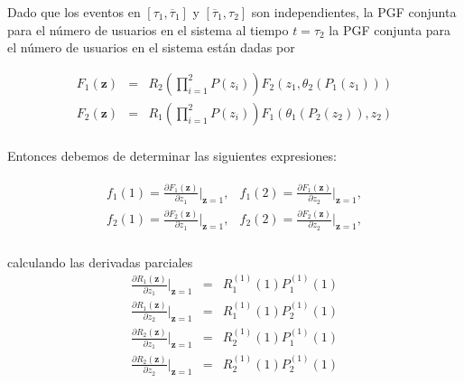 \documentclass{article}
\begin{document}
Dado que los eventos en
$\left[\tau_{1},\overline{\tau}_{1}\right]$ y $\left[\overline{\tau}_{1},\tau_{2}\right]$ son independientes, la
PGF conjunta para el n\'umero de usuarios en el sistema al tiempo $t=\tau_{2}$ la PGF conjunta para el n\'umero de usuarios en el sistema est\'an dadas por

\begin{eqnarray*}
F_{1}\left(\mathbf{z}\right)&=&R_{2}\left(\prod_{i=1}^{2}P\left(z_{i}\right)\right)F_{2}\left(z_{1},\theta_{2}\left(P_{1}\left(z_{1}\right)\right)\right)\\
F_{2}\left(\mathbf{z}\right)&=&R_{1}\left(\prod_{i=1}^{2}P\left(z_{i}\right)\right)F_{1}\left(\theta_{1}\left(P_{2}\left(z_{2}\right)\right),z_{2}\right)\\
\end{eqnarray*}

Entonces debemos de determinar las siguientes expresiones:

\begin{eqnarray*}
\begin{array}{cc}
f_{1}\left(1\right)=\frac{\partial F_{1}\left(\mathbf{z}\right)}{\partial z_{1}}|_{\mathbf{z}=1}, & f_{1}\left(2\right)=\frac{\partial F_{1}\left(\mathbf{z}\right)}{\partial z_{2}}|_{\mathbf{z}=1},\\
f_{2}\left(1\right)=\frac{\partial F_{2}\left(\mathbf{z}\right)}{\partial z_{1}}|_{\mathbf{z}=1}, & f_{2}\left(2\right)=\frac{\partial F_{2}\left(\mathbf{z}\right)}{\partial z_{2}}|_{\mathbf{z}=1},\\
\end{array}
\end{eqnarray*}

calculando las derivadas parciales 
\begin{eqnarray*}
\frac{\partial R_{1}\left(\mathbf{z}\right)}{\partial
z_{1}}|_{\mathbf{z}=1}&=&R_{1}^{(1)}\left(1\right)P_{1}^{(1)}\left(1\right)\\
\frac{\partial R_{1}\left(\mathbf{z}\right)}{\partial
z_{2}}|_{\mathbf{z}=1}&=&R_{1}^{(1)}\left(1\right)P_{2}^{(1)}\left(1\right)\\
\frac{\partial R_{2}\left(\mathbf{z}\right)}{\partial
z_{1}}|_{\mathbf{z}=1}&=&R_{2}^{(1)}\left(1\right)P_{1}^{(1)}\left(1\right)\\
\frac{\partial R_{2}\left(\mathbf{z}\right)}{\partial
z_{2}}|_{\mathbf{z}=1}&=&R_{2}^{(1)}\left(1\right)P_{2}^{(1)}\left(1\right)\\
\end{eqnarray*}
\end{document}
